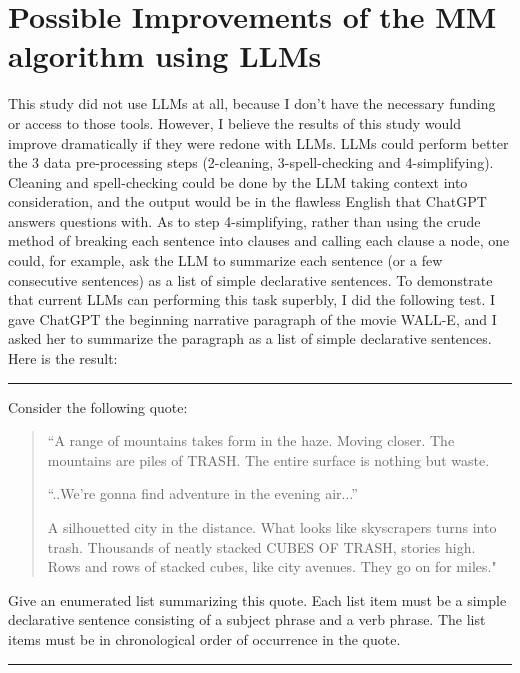 \documentclass[12pt]{article}
\begin{document}
\section{Possible Improvements
of the MM algorithm
using LLMs}

This study did not use LLMs at all,
because I don't have the necessary
funding or
access to those tools.
However,
I believe the results
of this study would improve
dramatically if they were redone with LLMs.
LLMs could perform better
the 3 data pre-processing steps
(2-cleaning, 3-spell-checking and 4-simplifying).
Cleaning and spell-checking
could be done by the LLM
taking context into consideration,
and the output would be in the 
flawless English that ChatGPT
answers questions with.
As to step 4-simplifying,
rather than using the crude method
of breaking each sentence into clauses
and calling each clause a node,
one could, for example,
ask the LLM to summarize each sentence (or a few 
consecutive sentences) as a list of simple
declarative sentences.
To demonstrate that current LLMs can 
performing this task superbly, I
did the following test. I gave ChatGPT the
beginning narrative paragraph of the movie 
WALL-E, and I asked her to summarize the
paragraph as a list of simple declarative sentences.
Here is the result:
\\
\hrule
{} 

Consider the following quote:
\begin{quote}
``A range of mountains takes form in the haze.
Moving closer.
The mountains are piles of TRASH.
The entire surface is nothing but waste.

``..We're gonna find adventure in the evening air...''

A silhouetted city in the distance.
What looks like skyscrapers turns into trash.
Thousands of neatly stacked CUBES OF TRASH, stories high.
Rows and rows of stacked cubes, like city avenues.
They go on for miles."
\end{quote}

Give an enumerated list summarizing this quote.
Each list item must be a simple declarative sentence
consisting of a subject phrase and a verb phrase.
The list items must be in chronological order of occurrence
in the quote.
\\
\hrule
{}
\end{document}
